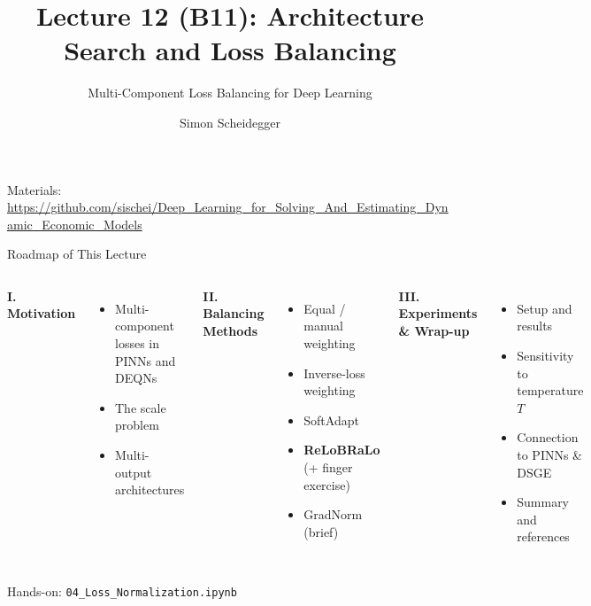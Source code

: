 \documentclass[aspectratio=169,11pt]{beamer}
\title[Lecture 12 (B11)]{Lecture 12 (B11): Architecture Search and Loss Balancing}
\subtitle{Multi-Component Loss Balancing for Deep Learning}
\author{Simon Scheidegger}
\institute{HEC, University of Lausanne}
\date{}
\begin{document}
\newcommand{\exercisepause}{%
  \tikz[baseline=(X.base)]{\node[fill=darkgreen!80!black, text=white,
  rounded corners=2pt, inner sep=3pt, font=\scriptsize\bfseries](X){PAUSE --- 5 min};}}



{
\begin{frame}
\titlepage
\vspace{-0.4cm}
\begin{center}
{\footnotesize Materials: \url{https://github.com/sischei/Deep_Learning_for_Solving_And_Estimating_Dynamic_Economic_Models}}
\end{center}
\end{frame}
}

\begin{frame}{Roadmap of This Lecture}
\begin{columns}[T]
\textbf{I. Motivation}
\begin{itemize}
    \item Multi-component losses in PINNs and DEQNs
    \item The scale problem
    \item Multi-output architectures
\end{itemize}

\vspace{0.4em}
\textbf{II. Balancing Methods}
\begin{itemize}
    \item Equal / manual weighting
    \item Inverse-loss weighting
    \item SoftAdapt
    \item \textbf{ReLoBRaLo} (+ finger exercise)
    \item GradNorm (brief)
\end{itemize}

\textbf{III. Experiments \& Wrap-up}
\begin{itemize}
    \item Setup and results
    \item Sensitivity to temperature $T$
    \item Connection to PINNs \& DSGE
    \item Summary and references
\end{itemize}
\end{columns}

\vspace{0.2em}
\begin{center}
{\scriptsize Hands-on: \texttt{04\_Loss\_Normalization.ipynb}}
\end{center}
\end{frame}
\end{document}
